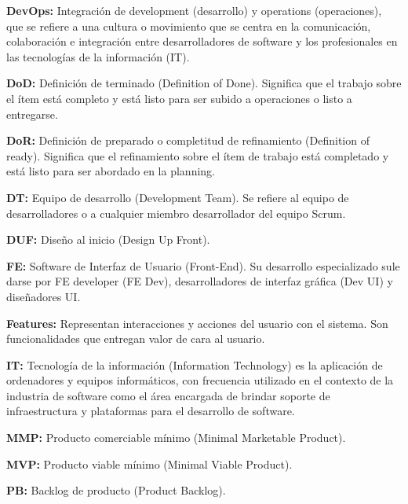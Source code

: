 \begin{description}
 \item {\textbf{DevOps:} Integración de development (desarrollo) y operations (operaciones), que se refiere a una cultura o movimiento que se centra en la comunicación, colaboración e integración entre desarrolladores de software y los profesionales en las tecnologías de la información (IT).}
 
  \item {\textbf{DoD:} Definición de terminado (Definition of Done). Significa que el trabajo sobre el ítem está completo y está listo para ser subido a operaciones o listo a entregarse.}
  
  \item {\textbf{DoR:} Definición de preparado o completitud de refinamiento (Definition of ready). Significa que el refinamiento sobre el ítem de trabajo está completado y está listo para ser abordado en la planning.}
  
  \item {\textbf{DT:} Equipo de desarrollo (Development Team). Se refiere al equipo de desarrolladores o a cualquier miembro desarrollador del equipo Scrum.}
  
  \item {\textbf{DUF:} Diseño al inicio (Design Up Front).}

  \item {\textbf{FE:} Software de Interfaz de Usuario (Front-End). Su desarrollo especializado sule darse por FE developer (FE Dev), desarrolladores de interfaz gráfica (Dev UI) y diseñadores UI.}
  
  \item {\textbf{Features:} Representan interacciones y acciones del usuario con el sistema. Son funcionalidades que entregan valor de cara al usuario.}
  
  \item {\textbf{IT:} Tecnología de la información (Information Technology) es la aplicación de ordenadores y equipos informáticos, con frecuencia utilizado en el contexto de la industria de software como el área encargada de brindar soporte de infraestructura y plataformas para el desarrollo de software.}
  
  \item {\textbf{MMP:} Producto comerciable mínimo (Minimal Marketable Product).}
  
  \item {\textbf{MVP:} Producto viable mínimo (Minimal Viable Product).}
  
  \item {\textbf{PB:} Backlog de producto (Product Backlog).}
  

\end{description}
